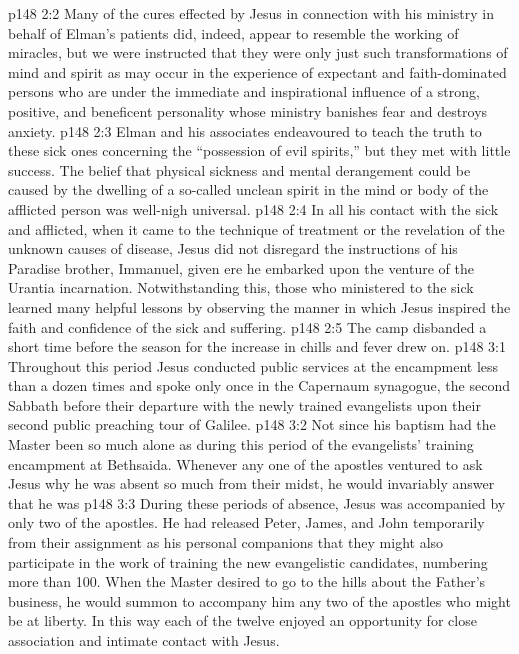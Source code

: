 \vs p148 2:2 Many of the cures effected by Jesus in connection with his ministry in behalf of Elman’s patients did, indeed, appear to resemble the working of miracles, but we were instructed that they were only just such transformations of mind and spirit as may occur in the experience of expectant and faith\hyp{}dominated persons who are under the immediate and inspirational influence of a strong, positive, and beneficent personality whose ministry banishes fear and destroys anxiety.
\vs p148 2:3 Elman and his associates endeavoured to teach the truth to these sick ones concerning the “possession of evil spirits,” but they met with little success. The belief that physical sickness and mental derangement could be caused by the dwelling of a so\hyp{}called unclean spirit in the mind or body of the afflicted person was well\hyp{}nigh universal.
\vs p148 2:4 In all his contact with the sick and afflicted, when it came to the technique of treatment or the revelation of the unknown causes of disease, Jesus did not disregard the instructions of his Paradise brother, Immanuel, given ere he embarked upon the venture of the Urantia incarnation. Notwithstanding this, those who ministered to the sick learned many helpful lessons by observing the manner in which Jesus inspired the faith and confidence of the sick and suffering.
\vs p148 2:5 The camp disbanded a short time before the season for the increase in chills and fever drew on.
\vs p148 3:1 Throughout this period Jesus conducted public services at the encampment less than a dozen times and spoke only once in the Capernaum synagogue, the second Sabbath before their departure with the newly trained evangelists upon their second public preaching tour of Galilee.
\vs p148 3:2 Not since his baptism had the Master been so much alone as during this period of the evangelists’ training encampment at Bethsaida. Whenever any one of the apostles ventured to ask Jesus why he was absent so much from their midst, he would invariably answer that he was 
\vs p148 3:3 During these periods of absence, Jesus was accompanied by only two of the apostles. He had released Peter, James, and John temporarily from their assignment as his personal companions that they might also participate in the work of training the new evangelistic candidates, numbering more than 100. When the Master desired to go to the hills about the Father’s business, he would summon to accompany him any two of the apostles who might be at liberty. In this way each of the twelve enjoyed an opportunity for close association and intimate contact with Jesus.
